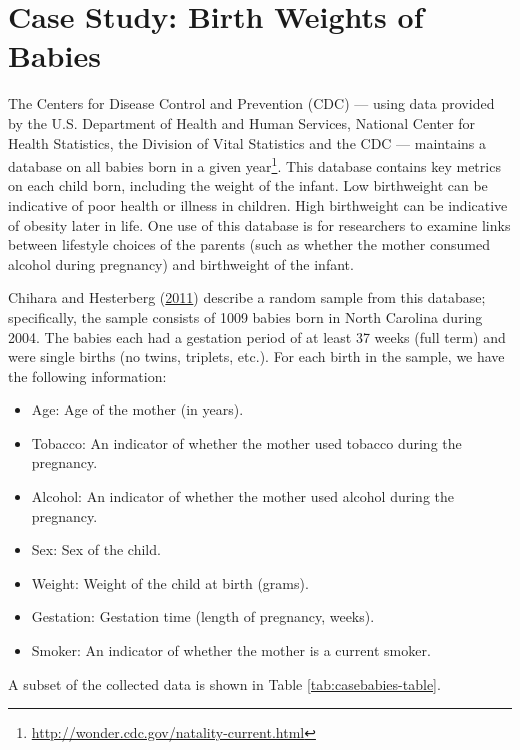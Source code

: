 \documentclass[]{book}
\providecommand{\tightlist}{%
  \setlength{\itemsep}{0pt}\setlength{\parskip}{0pt}}
\let\rmarkdownfootnote\footnote%
\def\footnote{\protect\rmarkdownfootnote}
\theoremstyle{plain}
\theoremstyle{mydefn}
\theoremstyle{myexmpl}
\theoremstyle{remark}
\begin{document}
\hypertarget{CaseBabies}{\chapter{Case Study: Birth Weights of
Babies}\label{CaseBabies}}

The Centers for Disease Control and Prevention (CDC) --- using data
provided by the U.S. Department of Health and Human Services, National
Center for Health Statistics, the Division of Vital Statistics and the
CDC --- maintains a database on all babies born in a given
year\footnote{\url{http://wonder.cdc.gov/natality-current.html}}. This
database contains key metrics on each child born, including the weight
of the infant. Low birthweight can be indicative of poor health or
illness in children. High birthweight can be indicative of obesity later
in life. One use of this database is for researchers to examine links
between lifestyle choices of the parents (such as whether the mother
consumed alcohol during pregnancy) and birthweight of the infant.

Chihara and Hesterberg (\protect\hyperlink{ref-Chihara2011}{2011})
describe a random sample from this database; specifically, the sample
consists of 1009 babies born in North Carolina during 2004. The babies
each had a gestation period of at least 37 weeks (full term) and were
single births (no twins, triplets, etc.). For each birth in the sample,
we have the following information:

\begin{itemize}
\tightlist
\item
  Age: Age of the mother (in years).
\item
  Tobacco: An indicator of whether the mother used tobacco during the
  pregnancy.
\item
  Alcohol: An indicator of whether the mother used alcohol during the
  pregnancy.
\item
  Sex: Sex of the child.
\item
  Weight: Weight of the child at birth (grams).
\item
  Gestation: Gestation time (length of pregnancy, weeks).
\item
  Smoker: An indicator of whether the mother is a current smoker.
\end{itemize}

A subset of the collected data is shown in Table
\ref{tab:casebabies-table}.
\end{document}
